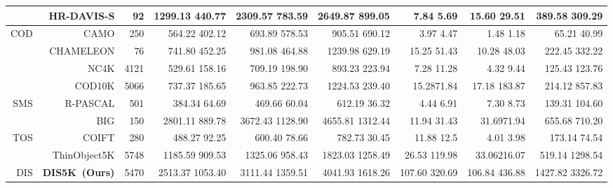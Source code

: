\documentclass[10pt,twocolumn,letterpaper]{article}
\def \bbb{\color{blue}}
\def \rrr{\color{red}}
\def \ggg{\color{green}}
\def \kkk{\color{black}}
\def \ourdataset{DIS5K}
\begin{document}
\begin{table*}[t!]
{\begin{tabular}{r|r||r|rrr|rrr}
        & HR-DAVIS-S\cite{perazzi2016benchmark}  &  92  &  1299.13  440.77  &  2309.57  783.59  &  2649.87  899.05  &  7.84  5.69  &  15.60  29.51  &  389.58  309.29  \\
        \hline 
\multirow{4}{*}{COD} & CAMO\cite{le2019anabranch}  &  250  &  564.22  402.12  &  693.89  578.53  &  905.51  690.12  &  3.97  4.47  &  1.48  1.18  &  65.21  40.99  \\ 
        & CHAMELEON\cite{chameleon}  &  76  &  741.80  452.25  &  981.08  464.88  &  1239.98  629.19  &  15.25  51.43  &  10.28  48.03  &  222.45  332.22  \\
        & NC4K\cite{fan2020camouflaged}  &  4121  &  529.61  158.16  &  709.19  198.90  &  893.23  223.94  &  7.28  11.28  &  4.32  9.44  &  125.43  123.76  \\
& COD10K\cite{fan2020camouflaged}  &  5066  &  737.37  185.65  &  963.85  222.73  &  1224.53  239.40  &  \bbb15.28\kkk  \bbb71.84\kkk  &  17.18  \bbb183.87\kkk  &  214.12  \bbb857.83\kkk  \\
        \hline 
\multirow{2}{*}{SMS} & R-PASCAL\cite{cheng2020cascadepsp}  &  501  &  384.34  64.69  &  469.66  60.04  &  612.19  36.32  &  4.44  6.91  &  7.30  8.73  &  139.31  104.60  \\
        & BIG\cite{cheng2020cascadepsp}  &  150  &  \rrr2801.11 \kkk  889.78  &  \rrr 3672.43 \kkk  \bbb1128.90\kkk  &  \rrr 4655.81 \kkk  \bbb1312.44\kkk  &  11.94  31.43  &  \bbb31.69\kkk  71.94  &  \ggg655.68 \kkk  710.20  \\
        \hline 
        \multirow{2}{*}{TOS} & COIFT\cite{liew2021deep}  &  280  &  488.27  92.25  &  600.40  78.66  &  782.73  30.45  &  11.88  12.5  &  4.01  3.98  &  173.14  74.54  \\
        & ThinObject5K\cite{liew2021deep}  &  5748  &  1185.59  \bbb909.53\kkk  &  1325.06  958.43  &  1823.03  1258.49  &  \ggg26.53 \kkk  \ggg119.98\kkk  &  \ggg33.06\kkk  \ggg216.07\kkk  &  \bbb519.14 \kkk  \ggg1298.54\kkk  \\
        \hline 
DIS & \textbf{\ourdataset~(Ours)}  &  5470  &  \bbb 2513.37 \kkk  \rrr1053.40\kkk  &  \bbb 3111.44 \kkk  \ggg1359.51\kkk  &  \bbb 4041.93 \kkk  \ggg1618.26\kkk  &  \rrr 107.60  320.69 \kkk  &  \rrr 106.84  436.88 \kkk &  \rrr 1427.82  3326.72 \kkk \\ 
        \bottomrule  
    \end{tabular}
    \vspace{-10pt}
    }
\end{table*}
\end{document}
